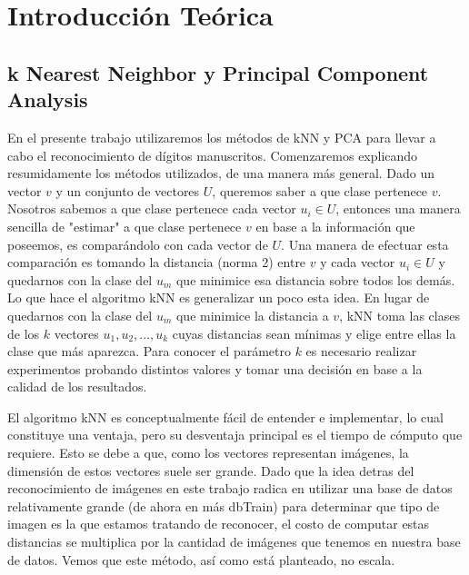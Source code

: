 \section{Introducción Teórica}
%
\subsection{k Nearest Neighbor y Principal Component Analysis}
En el presente trabajo utilizaremos los métodos de kNN y PCA para llevar a cabo el reconocimiento de dígitos manuscritos. Comenzaremos explicando resumidamente los métodos utilizados, de una manera más general. Dado un vector $v$ y un conjunto de vectores $U$, queremos saber a que clase pertenece $v$. Nosotros sabemos a que clase pertenece cada vector $u_i \in U$, entonces una manera sencilla de "estimar" a que clase pertenece $v$ en base a la información que poseemos, es comparándolo con cada vector de $U$. Una manera de efectuar esta comparación es tomando la distancia (norma 2) entre $v$ y cada vector $u_i \in U$ y quedarnos con la clase del $u_m$ que minimice esa distancia sobre todos los demás. Lo que hace el algoritmo kNN es generalizar un poco esta idea. En lugar de quedarnos con la clase del $u_m$ que minimice la distancia a $v$, kNN toma las clases de los $k$ vectores $u_1, u_2, ..., u_k$ cuyas distancias sean mínimas y elige entre ellas la clase que más aparezca. Para conocer el parámetro $k$ es necesario realizar experimentos probando distintos valores y tomar una decisión en base a la calidad de los resultados.
\par El algoritmo kNN es conceptualmente fácil de entender e implementar, lo cual constituye una ventaja, pero su desventaja principal es el tiempo de cómputo que requiere. Esto se debe a que, como los vectores representan imágenes, la dimensión de estos vectores suele ser grande. Dado que la idea detras del reconocimiento de imágenes en este trabajo radica en utilizar una base de datos relativamente grande (de ahora en más dbTrain) para determinar que tipo de imagen es la que estamos tratando de reconocer, el costo de computar estas distancias se multiplica por la cantidad de imágenes que tenemos en nuestra base de datos. Vemos que este método, así como está planteado, no escala.
